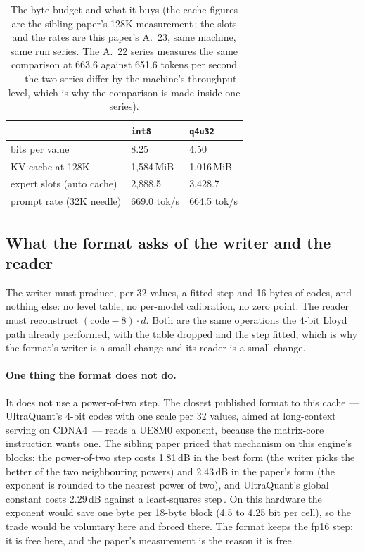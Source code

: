 \documentclass[10pt,twocolumn]{article}
\begin{document}
\begin{table}[t]
\centering
\caption{The byte budget and what it buys (the cache figures are the sibling paper's 128K measurement\,\cite{shear};
the slots and the rates are this paper's A.~23, same machine, same run series.  The A.~22 series measures
the same comparison at 663.6 against 651.6 tokens per second --- the two series differ by the machine's
throughput level, which is why the comparison is made inside one series).}
\label{tab:bytes}
\begin{tabularx}{\linewidth}{@{}lXX@{}}
\toprule
& \texttt{int8} & \texttt{q4u32} \\
\midrule
bits per value            & 8.25 & 4.50 \\
KV cache at 128K           & 1,584\,MiB & 1,016\,MiB \\
expert slots (auto cache)  & 2,888.5 & 3,428.7 \\
prompt rate (32K needle)  & 669.0 tok/s & 664.5 tok/s \\
\bottomrule
\end{tabularx}
\end{table}


\subsection{What the format asks of the writer and the reader}

The writer must produce, per 32 values, a fitted step and 16 bytes of codes, and nothing else: no level
table, no per-model calibration, no zero point. The reader must reconstruct $(\text{code}-8)\cdot d$. Both
are the same operations the 4-bit Lloyd path already performed, with the table dropped and the step fitted,
which is why the format's writer is a small change and its reader is a small change.

\paragraph{One thing the format does not do.} It does not use a power-of-two step. The closest published
format to this cache --- UltraQuant's 4-bit codes with one scale per 32 values, aimed at long-context
serving on CDNA4\,\cite{ultraquant} --- reads a UE8M0 exponent, because the matrix-core instruction wants
one. The sibling paper priced that mechanism on this engine's blocks: the power-of-two step costs 1.81\,dB
in the best form (the writer picks the better of the two neighbouring powers) and 2.43\,dB in the paper's
form (the exponent is rounded to the nearest power of two), and UltraQuant's global constant costs 2.29\,dB
against a least-squares step\,\cite{shear}. On this hardware the exponent would save one byte per 18-byte
block (4.5 to 4.25 bit per cell), so the trade would be voluntary here and forced there. The format keeps
the fp16 step: it is free here, and the paper's measurement is the reason it is free.
\end{document}
